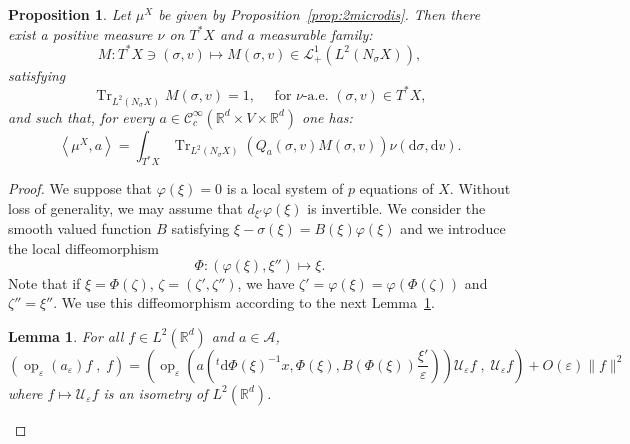 \documentclass[10pt]{amsart}
\newtheorem{prop}[cdrthm]{Proposition}
\newtheorem{lemm}[cdrthm]{Lemma}
\theoremstyle{definition}
\DeclareMathOperator{\Trr}{Tr}
\DeclareMathOperator{\op}{op}
\newcommand*\R{{\mathbb R}}
\newcommand*\eps{\varepsilon}
\newcommand*\Tr{\Trr}
\numberwithin{equation}{section}
\newcommand*{\dd}{\mathrm{d}}
\newcommand*{\dv}{\dd v}
\newcommand*{\dsigma}{\dd \sigma}
\newcommand*{\dPhi}{\dd \Phi} %
\begin{document}
\begin{prop}\label{prop:compact}
Let $\mu^X$ be given by Proposition~\ref{prop:2microdis}. Then there exist a positive measure $\nu$ on $T^*X$ and a measurable family:
\[
M:T^*X\ni(\sigma,v)\longmapsto M(\sigma,v)\in \mathcal{L}^1_+(L^2(N_\sigma X)),
\]
satisfying
\[
\Tr_{L^2(N_\sigma X)} M(\sigma,v)=1,\quad \text{ for }\nu\text{-a.e. }(\sigma,v)\in T^*X,
\]
and such that, for every $a\in {\mathcal C}^\infty_c(\R^d\times V\times \R^d)$ one has:
\[
\left\langle \mu^{X},a\right\rangle = \int_{T^*X}\Tr_{L^2(N_\sigma X)}(Q_a(\sigma,v)M(\sigma,v))\nu(\dsigma,\dv).
\]
\end{prop}


\begin{proof}
We suppose that $\varphi(\xi)=0$ is a local system of $p$ equations of $X$. Without loss of generality, we may assume that $d_{\xi'} \varphi(\xi)$ is invertible. We consider the smooth valued function $B$ satisfying $\xi-\sigma(\xi)=B(\xi) \varphi(\xi)$ and we introduce the local diffeomorphism
\[
\Phi : \left(\varphi(\xi),\xi''\right)\mapsto \xi.
\]
Note that if $\xi=\Phi(\zeta)$, $\zeta=(\zeta',\zeta'')$, we have $\zeta'=\varphi(\xi)=\varphi(\Phi(\zeta))$ and $\zeta''=\xi''$. We use this diffeomorphism according to the next Lemma~\ref{lem:geometry}.

\begin{lemm}\label{lem:geometry}
For all $f\in L^2(\R^d)$ and $a\in{\mathcal A}$,
\[
\left(\op_\eps(a_\eps)f\;,\;f\right) = \left(\op_\eps\left(a\left(^t \dPhi (\xi)^{-1} x,\Phi(\xi),B\left(\Phi(\xi)\right) \frac{\xi'}{\eps}\right)\right) {\mathcal U}_\eps f\;,\;{\mathcal U}_\eps f\right) + O(\eps) \| f\| ^2
\]
where $f\mapsto {\mathcal U}_\eps f$ is an isometry of $L^2(\R^d)$.
\end{lemm}



\end{proof}
\end{document}
